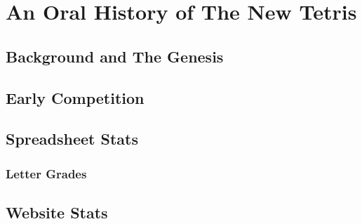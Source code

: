 \part{An Oral History of The New Tetris}
  \chapter{Background and The Genesis}
  \chapter{Early Competition}
  \chapter{Spreadsheet Stats}
    \section{Letter Grades}
  \chapter{Website Stats}